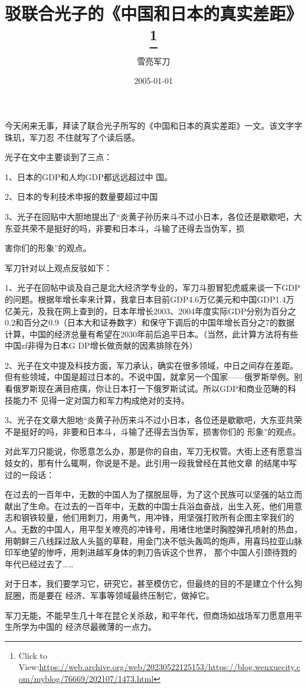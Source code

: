 \documentclass{article}
\title{驳联合光子的《中国和日本的真实差距》\footnote{Click to View:\url{https://web.archive.org/web/20230522125153/https://blog.wenxuecity.com/myblog/76669/202107/1473.html}}}
\author{雪亮军刀}
\date{2005-01-01}
\begin{document}

\maketitle


\Large

﻿今天闲来无事，拜读了联合光子所写的《中国和日本的真实差距》一文。该文字字珠玑，军刀忍
不住就写了个读后感。 


光子在文中主要谈到了三点： 

1、日本的GDP和人均GDP都远远超过中
国。 


2、日本的专利技术申报的数量要超过中国 

3、光子在回贴中大胆地提出了“炎黄子孙历来斗不过小日本，各位还是歇歇吧，大东亚共荣不是挺好的吗，非要和日本斗，斗输了还得去当伪军，损

\newpage
害你们的形象”的观点。 


军刀针对以上观点反驳如下： 

1、光子在回帖中谈及自己是北大经济学专业的，军刀斗胆冒犯虎威来谈一下GDP的问题。根据年增长率来计算，我拿日本目前GDP4.6万亿美元和中国GDP1.4万亿美元，及我在网上查到的，日本年增长2003、2004年度实际GDP分别为百分之0.2和百分之0.9（日本大和证券数字）和保守下调后的中国年增长百分之7的数据计算，中国的经济总量有希望在2030年前后追平日本。（当然，此计算方法将有些中国zf非得为日本G
DP增长做贡献的因素排除在外） 

2、光子在文中提及科技方面，军刀承认，确实在很多领域，中日之间存在差距。但有些领域，中国是超过日本的。不说中国，就拿另一个国家——俄罗斯举例。别看俄罗斯现在满目疮痍，你让日本打一下俄罗斯试试。所以GDP和商业范畴的科技能力不
见得一定对国力和军力构成绝对的支持。 

\newpage

3、光子在文章大胆地“炎黄子孙历来斗不过小日本，各位还是歇歇吧，大东亚共荣不是挺好的吗，非要和日本斗，斗输了还得去当伪军，损害你们的
形象”的观点。 

对此军刀只能说，你愿意怎么办，那是你的自由，军刀无权管。大街上还有愿意当妓女的，那有什么辄啊，你说是不是。此引用一段我曾经在其他文章
的结尾中写过的一段话： 

在过去的一百年中，无数的中国人为了摆脱屈辱，为了这个民族可以坚强的站立而献出了生命。在过去的一百年中，无数的中国士兵浴血奋战，出生入死，他们用意志和钢铁较量，他们用刺刀，用勇气，用冲锋，用坚强打败所有企图主宰我们的人。无数的中国人，用平型关嘹亮的冲锋号，用堵住地堡时胸膛弹孔喷射的热血，用朝鲜三八线踩过敌人头盔的草鞋，用金门决不低头轰鸣的炮声，用喜玛拉亚山脉印军绝望的惨呼，用刺进越军身体的刺刀告诉这个世界，
那个中国人引颈待戮的年代已经过去了…… 

\newpage

对于日本，我们要学习它，研究它，甚至模仿它，但最终的目的不是建立个什么狗屁圈，而是要在
经济、军事等领域最终压制它，做掉它。 

军刀无能，不能早生几十年在昆仑关杀敌，和平年代，但商场如战场军刀愿意用平生所学为中国的
经济尽最微薄的一点力。 
\end{document}
